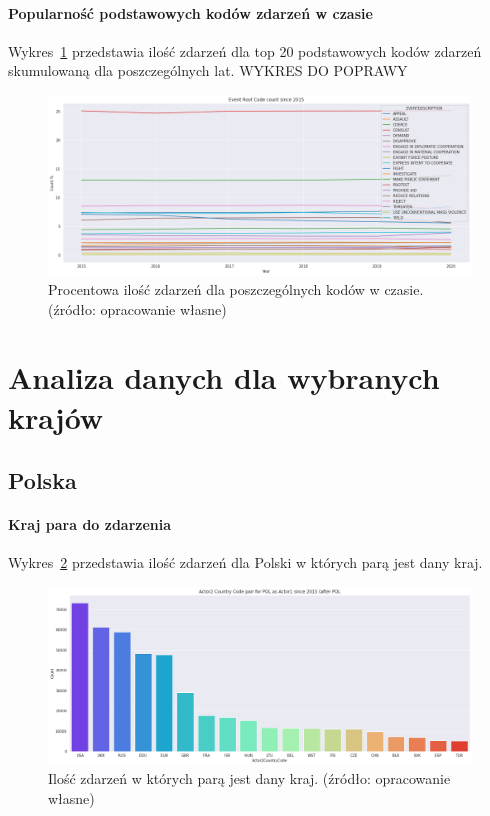 \documentclass[11pt]{report}
\begin{document}
    \paragraph{Popularność podstawowych kodów zdarzeń w czasie}
    Wykres~\ref{fig:GLOBALERCperc} przedstawia ilość zdarzeń dla top 20 podstawowych kodów zdarzeń skumulowaną dla poszczególnych lat.
    WYKRES DO POPRAWY
    \begin{figure}[ht!]
        \centering
        \includegraphics[width=1 \textwidth]{fig/GLOBAL/ERCperc.png}
        \caption{Procentowa ilość zdarzeń dla poszczególnych kodów w czasie. (źródło: opracowanie własne)}
        \label{fig:GLOBALERCperc}
    \end{figure}


    \section{Analiza danych dla wybranych krajów}

    \subsection{Polska}

    \paragraph{Kraj para do zdarzenia}


    Wykres~\ref{fig:PLpair} przedstawia ilość zdarzeń dla Polski w których parą jest dany kraj.

    \begin{figure}[ht!]
        \centering
        \includegraphics[width=1 \textwidth]{fig/PL/PLactor2Pair.png}
        \caption{Ilość zdarzeń w których parą jest dany kraj. (źródło: opracowanie własne)}
        \label{fig:PLpair}
    \end{figure}
\end{document}
